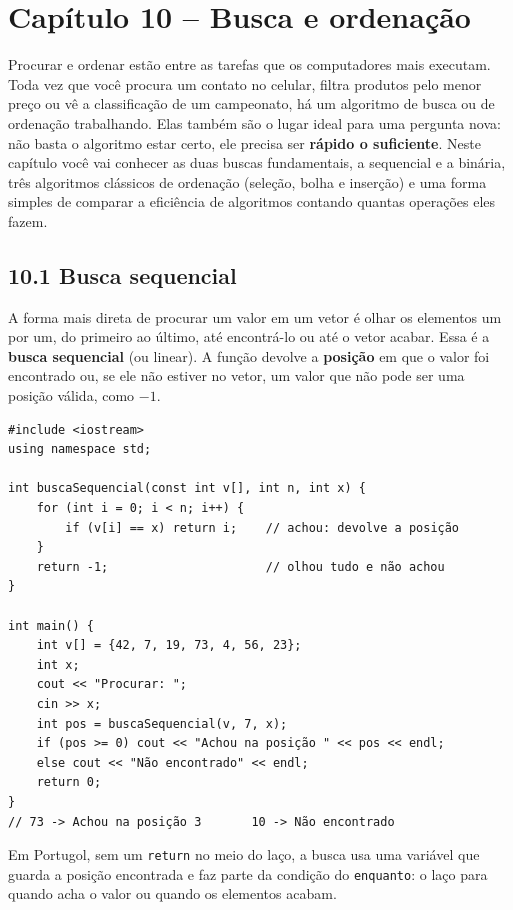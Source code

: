\section{Capítulo 10 -- Busca e ordenação}

Procurar e ordenar estão entre as tarefas que os computadores mais executam. Toda vez que você procura um contato no celular, filtra produtos pelo menor preço ou vê a classificação de um campeonato, há um algoritmo de busca ou de ordenação trabalhando. Elas também são o lugar ideal para uma pergunta nova: não basta o algoritmo estar certo, ele precisa ser \textbf{rápido o suficiente}. Neste capítulo você vai conhecer as duas buscas fundamentais, a sequencial e a binária, três algoritmos clássicos de ordenação (seleção, bolha e inserção) e uma forma simples de comparar a eficiência de algoritmos contando quantas operações eles fazem.

\subsection{10.1 Busca sequencial}

A forma mais direta de procurar um valor em um vetor é olhar os elementos um por um, do primeiro ao último, até encontrá-lo ou até o vetor acabar. Essa é a \textbf{busca sequencial} (ou linear). A função devolve a \textbf{posição} em que o valor foi encontrado ou, se ele não estiver no vetor, um valor que não pode ser uma posição válida, como $-1$.

\begin{codigo}
\begin{Verbatim}[breaklines=true, breaksymbolleft={}, fontsize=\footnotesize]
#include <iostream>
using namespace std;

int buscaSequencial(const int v[], int n, int x) {
    for (int i = 0; i < n; i++) {
        if (v[i] == x) return i;    // achou: devolve a posição
    }
    return -1;                      // olhou tudo e não achou
}

int main() {
    int v[] = {42, 7, 19, 73, 4, 56, 23};
    int x;
    cout << "Procurar: ";
    cin >> x;
    int pos = buscaSequencial(v, 7, x);
    if (pos >= 0) cout << "Achou na posição " << pos << endl;
    else cout << "Não encontrado" << endl;
    return 0;
}
// 73 -> Achou na posição 3       10 -> Não encontrado
\end{Verbatim}
\end{codigo}

Em Portugol, sem um \texttt{return} no meio do laço, a busca usa uma variável que guarda a posição encontrada e faz parte da condição do \texttt{enquanto}: o laço para quando acha o valor ou quando os elementos acabam.

